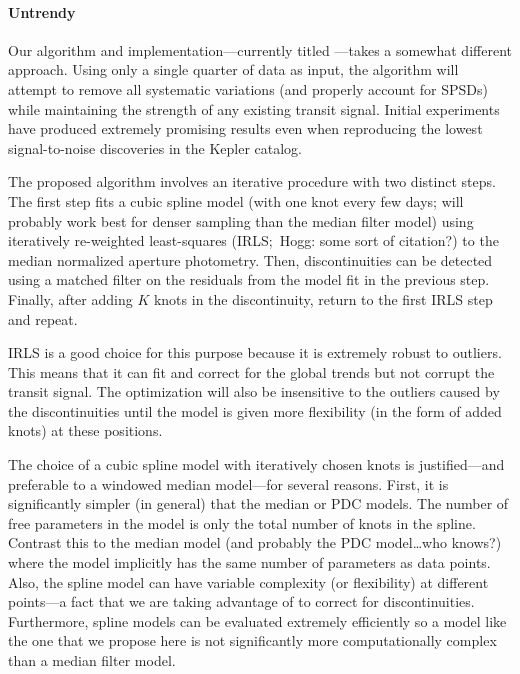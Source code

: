 \documentclass[letterpaper,12pt,preprint]{hack_aastex}
\newcommand{\Untrendy}{\package{Untrendy}}
\begin{document}
\paragraph{Untrendy}
Our algorithm and implementation---currently titled \Untrendy---takes a
somewhat different approach.
Using only a single quarter of data as input, the algorithm will attempt to
remove all systematic variations (and properly account for SPSDs) while
maintaining the strength of any existing transit signal.
Initial experiments have produced extremely promising results even when
reproducing the lowest signal-to-noise discoveries in the Kepler catalog.

The proposed algorithm involves an iterative procedure with two distinct
steps.
The first step fits a cubic spline model (with one knot every few days; will
probably work best for denser sampling than the median filter model) using
iteratively re-weighted least-squares (IRLS;\ Hogg: some sort of citation?) to
the median normalized aperture photometry.
Then, discontinuities can be detected using a matched filter on the residuals
from the model fit in the previous step.
Finally, after adding $K$ knots in the discontinuity, return to the first IRLS
step and repeat.

IRLS is a good choice for this purpose because it is extremely robust to
outliers.
This means that it can fit and correct for the global trends but not corrupt
the transit signal.
The optimization will also be insensitive to the outliers caused by the
discontinuities until the model is given more flexibility (in the form of
added knots) at these positions.

The choice of a cubic spline model with iteratively chosen knots is
justified---and preferable to a windowed median model---for several reasons.
First, it is significantly simpler (in general) that the median or PDC models.
The number of free parameters in the model is only the total number of knots
in the spline.
Contrast this to the median model (and probably the PDC model\ldots who
knows?) where the model implicitly has the same number of parameters as
data points.
Also, the spline model can have variable complexity (or flexibility) at
different points---a fact that we are taking advantage of to correct for
discontinuities.
Furthermore, spline models can be evaluated extremely efficiently so a model
like the one that we propose here is not significantly more computationally
complex than a median filter model.
\end{document}
